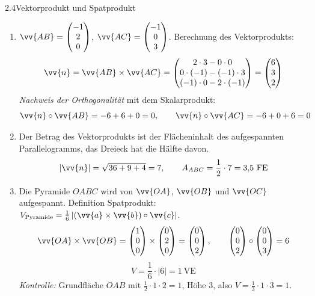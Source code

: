\begin{loesung}{2.4}{Vektorprodukt und Spatprodukt}
\begin{enumerate}[label=\alph*)]
  \item $\vv{AB} = \begin{pmatrix} -1\\ 2\\ 0\end{pmatrix}$, $\vv{AC} = \begin{pmatrix} -1\\ 0\\ 3\end{pmatrix}$. Berechnung des Vektorprodukts:
  \[\vv{n} = \vv{AB}\times\vv{AC} = \begin{pmatrix} 2\cdot 3-0\cdot 0\\ 0\cdot(-1)-(-1)\cdot 3\\ (-1)\cdot 0-2\cdot(-1)\end{pmatrix} = \begin{pmatrix} 6\\ 3\\ 2\end{pmatrix}\]
  \textit{Nachweis der Orthogonalität} mit dem Skalarprodukt:
  \[\vv{n}\circ\vv{AB} = -6+6+0 = 0,\qquad \vv{n}\circ\vv{AC} = -6+0+6 = 0\]
  \item Der Betrag des Vektorprodukts ist der Flächeninhalt des aufgespannten Parallelogramms, das Dreieck hat die Hälfte davon.
  \[|\vv{n}| = \sqrt{36+9+4} = 7,\qquad A_{ABC} = \dfrac{1}{2}\cdot 7 = 3{,}5\ \text{FE}\]
  \item Die Pyramide $OABC$ wird von $\vv{OA}$, $\vv{OB}$ und $\vv{OC}$ aufgespannt. Definition Spatprodukt: $V_{\text{Pyramide}} = \frac{1}{6}\left|(\vv{a}\times\vv{b})\circ\vv{c}\right|$.
  \[\vv{OA}\times\vv{OB} = \begin{pmatrix} 1\\ 0\\ 0\end{pmatrix}\times\begin{pmatrix} 0\\ 2\\ 0\end{pmatrix} = \begin{pmatrix} 0\\ 0\\ 2\end{pmatrix},\qquad \begin{pmatrix} 0\\ 0\\ 2\end{pmatrix}\circ\begin{pmatrix} 0\\ 0\\ 3\end{pmatrix} = 6\]
  \[V = \dfrac{1}{6}\cdot|6| = 1\ \text{VE}\]
  \textit{Kontrolle:} Grundfläche $OAB$ mit $\frac{1}{2}\cdot 1\cdot 2 = 1$, Höhe $3$, also $V = \frac{1}{3}\cdot 1\cdot 3 = 1$.
\end{enumerate}
\end{loesung}

